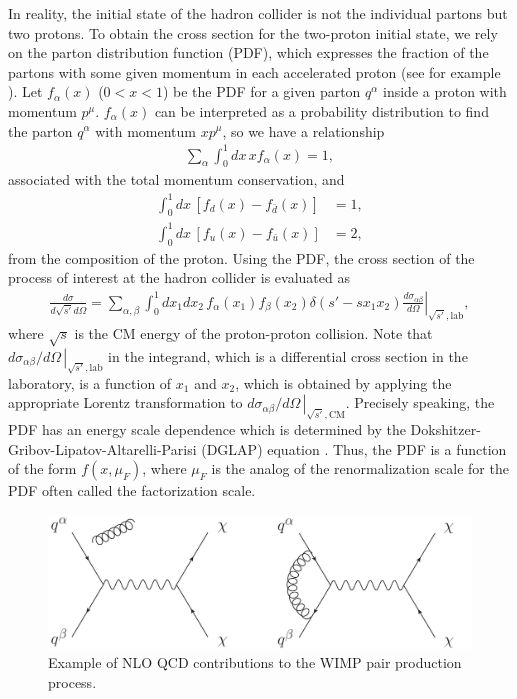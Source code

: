\documentclass[12pt,twoside,book]{article}
\begin{document}
In reality, the initial state of the hadron collider is not the individual partons but two protons.
To obtain the cross section for the two-proton initial state, we rely on the parton distribution function (PDF), which expresses the fraction of the partons with some given momentum in each accelerated proton (see for example \cite{Gao:2017yyd,Kovarik:2019xvh}).
Let $f_\alpha (x)$ ($0 < x < 1$) be the PDF for a given parton $q^\alpha$ inside a proton with momentum $p^\mu$.
$f_\alpha (x)$ can be interpreted as a probability distribution to find the parton $q^\alpha$ with momentum $x p^\mu$, so we have a relationship
\begin{align}
  \sum_\alpha \int_0^1 dx \, x f_\alpha (x) = 1,
\end{align}
associated with the total momentum conservation, and
\begin{align}
  \int_0^1 dx \, \left[ f_d (x) - f_{\bar{d}} (x) \right] &= 1,\\
  \int_0^1 dx \, \left[ f_u (x) - f_{\bar{u}} (x) \right] &= 2,
\end{align}
from the composition of the proton.
Using the PDF, the cross section of the process of interest at the hadron collider is evaluated as
\begin{align}
  \frac{d \sigma}{d \sqrt{s'} d \Omega} =
  \sum_{\alpha, \beta} \int_0^1 dx_1 dx_2 \, f_\alpha (x_1) f_\beta (x_2) \delta \left( s' - s x_1 x_2 \right)
  \left. \frac{d \sigma_{\alpha \beta}}{d \Omega} \right|_{\sqrt{s'}, \text{lab}},
\end{align}
where $\sqrt{s}$ is the CM energy of the proton-proton collision.
Note that $\left. d \sigma_{\alpha \beta} / d \Omega\, \right|_{\sqrt{s'}, \text{lab}}$ in the integrand, which is a differential cross section in the laboratory, is a function of $x_1$ and $x_2$, which is obtained by applying the appropriate Lorentz transformation to $\left. d \sigma_{\alpha \beta} / d \Omega\, \right|_{\sqrt{s'}, \text{CM}}$.
Precisely speaking, the PDF has an energy scale dependence which is determined by the Dokshitzer-Gribov-Lipatov-Altarelli-Parisi (DGLAP) equation \cite{Gribov:1972ri, Lipatov:1974qm, Altarelli:1977zs, Dokshitzer:1977sg}.
Thus, the PDF is a function of the form $f(x, \mu_F)$, where $\mu_F$ is the analog of the renormalization scale for the PDF often called the factorization scale.

\begin{figure}[t]
  \centering
  \includegraphics[width=0.8\hsize]{WIMP_production_NLO.pdf}
  \caption{Example of NLO QCD contributions to the WIMP pair production process.}
  \label{fig:WIMP_production_NLO}
\end{figure}
\end{document}
